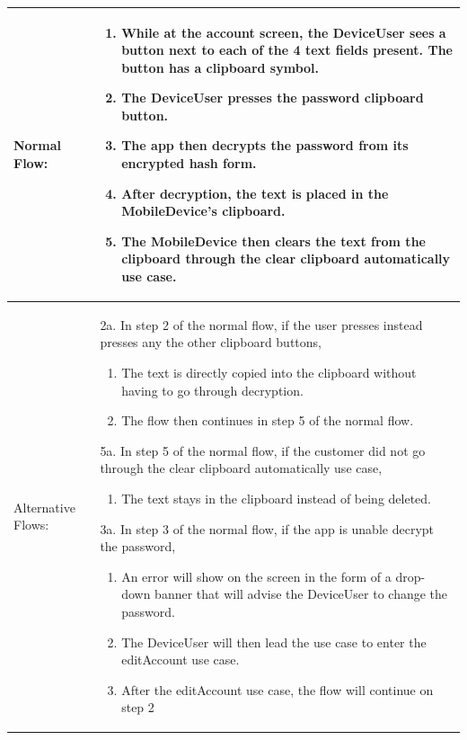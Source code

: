 \documentclass[stu]{apa7}
\newcommand{\nextitemblank}{\par\hspace*{\labelsep}\hspace*{\labelsep}}
\begin{document}
{\begin{xltabular}{\textwidth}{|l|X|}
              Normal Flow: &
                             \begin{enumerate}
                               \item While at the account screen, the DeviceUser sees a button next to each of the 4 text fields present. The button has a clipboard symbol.
                               \item The DeviceUser presses the password clipboard button.
                               \item The app then decrypts the password from its encrypted hash form.
                               \item After decryption, the text is placed in the MobileDevice’s clipboard.
                               \item The MobileDevice then clears the text from the clipboard through the clear clipboard automatically use case.
                             \end{enumerate} \\ \hline

              Alternative Flows: &
                                   \nextitemblank 2a. In step 2 of the normal flow, if the user presses instead presses any the other clipboard buttons,
                                   \begin{enumerate}
                                     \item The text is directly copied into the clipboard without having to go through decryption.
                                     \item The flow then continues in step 5 of the normal flow.
                                   \end{enumerate}

                                   \nextitemblank 5a. In step 5 of the normal flow, if the customer did not go through the clear clipboard automatically use case,
                                   \begin{enumerate}
                                     \item The text stays in the clipboard instead of being deleted.
                                   \end{enumerate}

                                   \nextitemblank 3a. In step 3 of the normal flow, if the app is unable decrypt the password,
                                   \begin{enumerate}
                                     \item An error will show on the screen in the form of a drop-down banner that will advise the DeviceUser to change the password.
                                     \item The DeviceUser will then lead the use case to enter the editAccount use case.
                                     \item After the editAccount use case, the flow will continue on step 2
                                   \end{enumerate} \\ \hline


\end{xltabular}}
\end{document}
